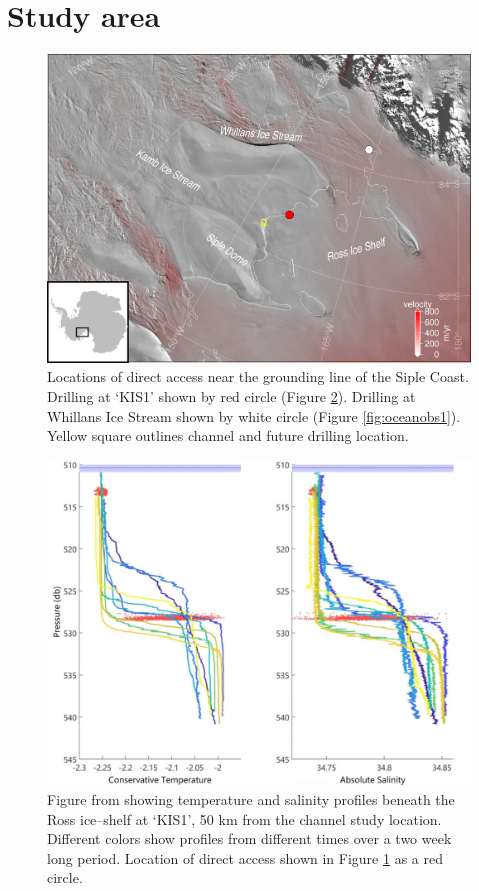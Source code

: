 \section{Study area} \label{sec:conditions}

\begin{figure}[!ht]
\centering
    \includegraphics[width=1\textwidth]{chapters/4/drilling_locations_small.png}
    \caption[]{Locations of direct access near the grounding line of the Siple Coast. Drilling at `KIS1' shown by red circle (Figure \ref{fig:oceanobs2}). Drilling at Whillans Ice Stream shown by white circle (Figure \ref{fig:oceanobs1}). Yellow square outlines channel and future drilling location.}
    \label{fig:map_drill}
\end{figure}

\begin{figure}[!ht]
\centering
    \includegraphics[width=1\textwidth]{chapters/4/oceanobs2.jpg}
    \caption[]{Figure from \cite{robinson2020ice} showing temperature and salinity profiles beneath the Ross ice--shelf at `KIS1', 50 km from the channel study location. Different colors show profiles from different times over a two week long period. Location of direct access shown in Figure \ref{fig:map_drill} as a red circle.}
    \label{fig:oceanobs2}
\end{figure}

